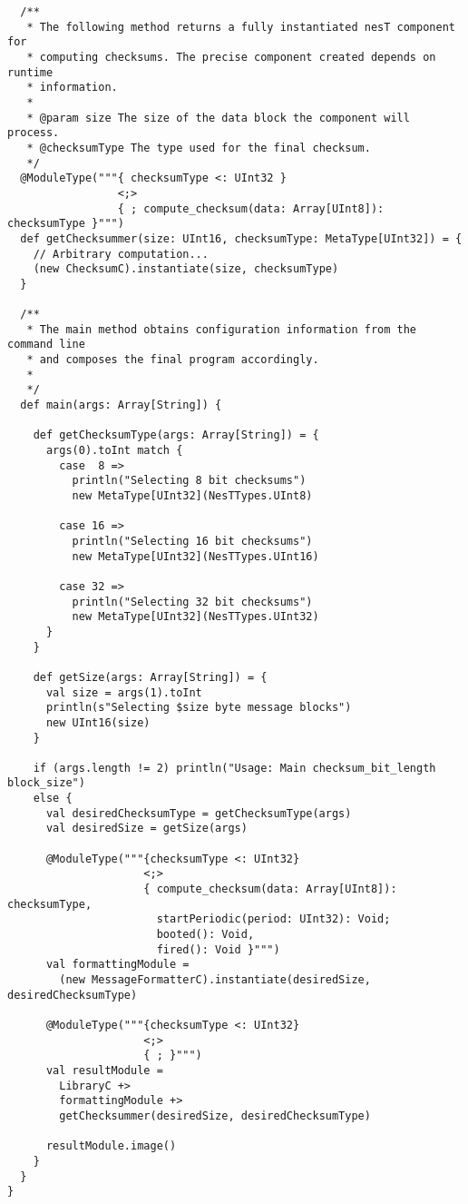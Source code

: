 {\begin{verbatim}
  /**
   * The following method returns a fully instantiated nesT component for 
   * computing checksums. The precise component created depends on runtime 
   * information.
   *
   * @param size The size of the data block the component will process.
   * @checksumType The type used for the final checksum.
   */
  @ModuleType("""{ checksumType <: UInt32 }
                 <;>
                 { ; compute_checksum(data: Array[UInt8]): checksumType }""")
  def getChecksummer(size: UInt16, checksumType: MetaType[UInt32]) = {
    // Arbitrary computation...
    (new ChecksumC).instantiate(size, checksumType)
  }
    
  /**
   * The main method obtains configuration information from the command line 
   * and composes the final program accordingly.
   * 
   */ 
  def main(args: Array[String]) {

    def getChecksumType(args: Array[String]) = {
      args(0).toInt match {
        case  8 => 
          println("Selecting 8 bit checksums")   
          new MetaType[UInt32](NesTTypes.UInt8)
        
        case 16 =>
          println("Selecting 16 bit checksums") 
          new MetaType[UInt32](NesTTypes.UInt16)

        case 32 =>
          println("Selecting 32 bit checksums")
          new MetaType[UInt32](NesTTypes.UInt32)
      }
    }

    def getSize(args: Array[String]) = {
      val size = args(1).toInt
      println(s"Selecting $size byte message blocks")
      new UInt16(size)
    }

    if (args.length != 2) println("Usage: Main checksum_bit_length block_size")
    else {
      val desiredChecksumType = getChecksumType(args)
      val desiredSize = getSize(args)

      @ModuleType("""{checksumType <: UInt32}
                     <;>
                     { compute_checksum(data: Array[UInt8]): checksumType,
                       startPeriodic(period: UInt32): Void;
                       booted(): Void,
                       fired(): Void }""")
      val formattingModule =
        (new MessageFormatterC).instantiate(desiredSize, desiredChecksumType)

      @ModuleType("""{checksumType <: UInt32}
                     <;>
                     { ; }""")
      val resultModule =
        LibraryC +>  
        formattingModule +> 
        getChecksummer(desiredSize, desiredChecksumType)

      resultModule.image()
    }
  }   
}
\end{verbatim}       
}

